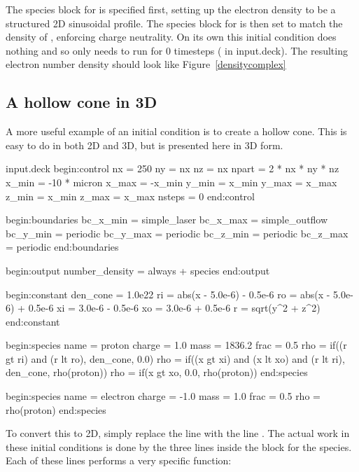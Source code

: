 The species block for  is specified
first, setting up the electron density to be a structured 2D sinusoidal
profile. The species block for  is then set to
match the density of , enforcing charge neutrality. On
its own this initial condition does nothing and so only needs to run for 0
timesteps ( in input.deck). The resulting electron number
density should look like Figure~\ref{densitycomplex}

\subsection{A hollow cone in 3D}
A more useful example of an initial condition is to create a hollow cone. This
is easy to do in both 2D and 3D, but is presented here in 3D form.
\begin{lboxverbatim}{input.deck}
begin:control
   nx = 250
   ny = nx
   nz = nx
   npart = 2 * nx * ny * nz
   x_min = -10 * micron
   x_max = -x_min
   y_min = x_min
   y_max = x_max
   z_min = x_min
   z_max = x_max
   nsteps = 0
end:control

begin:boundaries
   bc_x_min = simple_laser
   bc_x_max = simple_outflow
   bc_y_min = periodic
   bc_y_max = periodic
   bc_z_min = periodic
   bc_z_max = periodic
end:boundaries

begin:output
   number_density = always + species
end:output

begin:constant
   den_cone = 1.0e22
   ri = abs(x - 5.0e-6) - 0.5e-6
   ro = abs(x - 5.0e-6) + 0.5e-6
   xi = 3.0e-6 - 0.5e-6
   xo = 3.0e-6 + 0.5e-6
   r = sqrt(y^2 + z^2)
end:constant

begin:species
   name = proton
   charge = 1.0
   mass = 1836.2
   frac = 0.5
   rho = if((r gt ri) and (r lt ro), den_cone, 0.0)
   rho = if((x gt xi) and (x lt xo) and (r lt ri), den_cone, rho(proton))
   rho = if(x gt xo, 0.0, rho(proton))
end:species

begin:species
   name = electron
   charge = -1.0
   mass = 1.0
   frac = 0.5
   rho = rho(proton)
end:species
\end{lboxverbatim}

To convert this to 2D, simply replace the line
 with the line . The
actual work in these initial conditions is done by the three lines inside the
block for the  species. Each of these lines performs a very
specific function:

